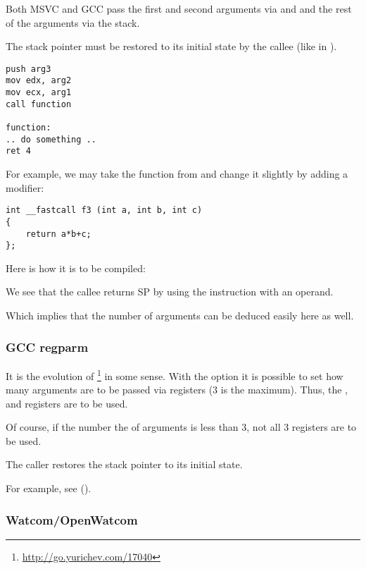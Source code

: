 Both MSVC and GCC pass the first and second arguments via \ECX and \EDX and the rest of the arguments via the stack.

The \gls{stack pointer} must be restored to its initial state by the \gls{callee} (like in ).

\begin{lstlisting}[caption=fastcall]
push arg3
mov edx, arg2
mov ecx, arg1
call function

function:
.. do something ..
ret 4
\end{lstlisting}

For example, we may take the function from  and change it slightly by adding a  modifier:

\begin{lstlisting}
int __fastcall f3 (int a, int b, int c)
{
	return a*b+c;
};
\end{lstlisting}

Here is how it is to be compiled:



We see that the \gls{callee} returns \ac{SP} by using the  instruction with an operand.

Which implies that the number of arguments can be deduced easily here as well.

\subsubsection{GCC regparm}

\newcommand{\URLREGPARMM}{\url{http://go.yurichev.com/17040}}

It is the evolution of \footnote{\URLREGPARMM} in some sense.
With the  option it is possible to set how many arguments are to be passed via registers (3 is the maximum).
Thus, the \EAX, \EDX and \ECX registers are to be used.

Of course, if the number the of arguments is less than 3, not all 3 registers are to be used.

The \gls{caller} restores the \gls{stack pointer} to its initial state.

For example, see ().

\subsubsection{Watcom/OpenWatcom}

